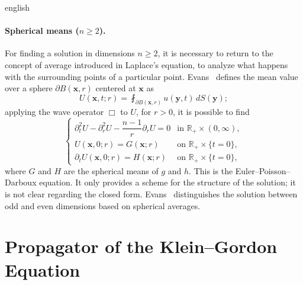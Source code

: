 \documentclass[../0000.tex]{subfiles}
\begin{document}
\begin{hyphenrules}{english}
\paragraph{Spherical means ($n\ge2$).}
For finding a solution in dimensions $n\ge2$, it is necessary to return to the concept of average
introduced in Laplace's equation, to analyze what happens with the surrounding points of a particular
point. Evans~\cite{evans2010} defines the mean value over a sphere $\partial B(\mathbf{x},r)$ centered at $\mathbf{x}$ as
\begin{equation}
  U(\mathbf{x},t;r)=\fint_{\partial B(\mathbf{x},r)}u(\mathbf{y},t)\,d S(\mathbf{y});
  \label{eq:spherical-mean}
\end{equation}
applying the wave operator $\Box$ to $U$, for $r>0$, it is possible to find
\begin{equation}
  \begin{cases}
    \partial_t^2U-\partial_r^2U-\dfrac{n-1}{r}\partial_rU=0 & \text{in } \mathbb{R}_+\times(0,\infty),\\
    U(\mathbf{x},0;r)=G(\mathbf{x};r) & \text{on } \mathbb{R}_+\times\{t=0\},\\
    \partial_tU(\mathbf{x},0;r)=H(\mathbf{x};r) & \text{on } \mathbb{R}_+\times\{t=0\},
  \end{cases}
  \label{eq:epd}
\end{equation}
where $G$ and $H$ are the spherical means of $g$ and $h$. This is the Euler--Poisson--Darboux equation.
It only provides a scheme for the structure of the solution; it is not clear regarding the closed form.
Evans~\cite{evans2010} distinguishes the solution between odd and even dimensions based on spherical
averages.

\section{Propagator of the Klein--Gordon Equation}\label{app-sec:kg-propagator}


\end{hyphenrules}
\end{document}
